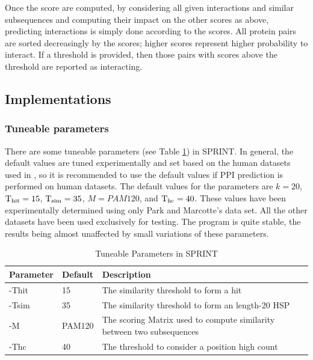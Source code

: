 Once the score are computed, by considering all given interactions and similar subsequences and computing their impact on the other scores as above, predicting interactions is simply done according to the scores. All protein pairs are sorted decreasingly by the scores; higher scores represent higher probability to interact. If a threshold is provided, then those pairs with scores above the threshold are reported as interacting. 

\subsection{Implementations}
\subsubsection{Tuneable parameters}
\label{sec:parameter}
There are some tuneable parameters (see Table \ref{tab_parameter_SPRINT}) in SPRINT. In general, the default values are tuned experimentally and set based on the human datasets used in \cite{li2017sprint}, so it is recommended to use the default values if PPI prediction is performed on human datasets. The default values for the parameters are $k = 20$, $\operatorname{T_{\rm hit}} = 15$, $\operatorname{T_{\rm sim}} = 35$, $M=PAM120$, and $\operatorname{T_{\rm hc}} = 40$. These values have been experimentally determined using only Park and Marcotte's data set. All the other datasets have been used exclusively for testing. The program is quite stable, the results being almost unaffected by small variations of these parameters.
\begin{table}[]
\begin{adjustwidth}{-2.5cm}{}
\caption{Tuneable Parameters in SPRINT}
\begin{tabular}{@{}lll@{}}
\toprule
Parameter & Default           & Description                                                        \\ \midrule
-Thit      & 15        & The similarity threshold to form a hit                             \\
-Tsim      & 35        & The similarity threshold to form an length-20 HSP                  \\
-M         & PAM120        & The scoring Matrix used to compute similarity between two subsequences \\
-Thc       & 40 & The threshold to consider a position high count                    \\ \bottomrule
\end{tabular}
\label{tab_parameter_SPRINT}
\end{adjustwidth}
\end{table}

